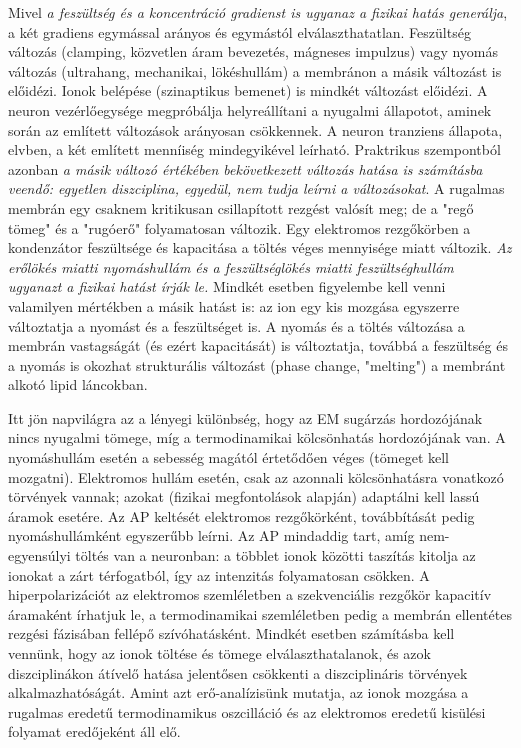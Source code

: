 \else
Mivel \textit{a feszültség és a koncentráció gradienst is ugyanaz a
fizikai hatás generálja}, a két gradiens egymással arányos és
egymástól elválaszthatatlan.
Feszültség változás (clamping, közvetlen áram bevezetés, mágneses impulzus) vagy nyomás változás (ultrahang, mechanikai, lökéshullám)
a membránon a másik változást is előidézi.
Ionok belépése (szinaptikus bemenet) is mindkét változást előidézi.
A neuron vezérlőegysége megpróbálja helyreállítani a nyugalmi állapotot,
aminek során az említett változások arányosan csökkennek.
A neuron tranziens állapota, elvben, a két említett menníiség mindegyikével leírható. Praktrikus szempontból azonban 
\textit{a másik változó értékében bekövetkezett változás hatása is számításba
veendő: egyetlen diszciplina, egyedül, nem tudja leírni a változásokat}.
A rugalmas membrán egy csaknem kritikusan csillapított rezgést valósít meg; de a "regő tömeg" és a "rugóerő" folyamatosan változik.
Egy elektromos rezgőkörben a kondenzátor feszültsége és kapacitása a
töltés véges mennyisége miatt változik.
\textit{Az erőlökés miatti nyomáshullám és a feszültséglökés miatti
feszültséghullám ugyanazt a fizikai hatást írják le.}
Mindkét esetben figyelembe kell venni valamilyen mértékben a másik 
hatást is: az ion egy kis mozgása egyszerre változtatja 
a nyomást és a feszültséget is.
A nyomás és a töltés változása a membrán vastagságát (és ezért kapacitását) is változtatja, továbbá a feszültség és a nyomás is 
okozhat strukturális változást (phase change, "melting")
a membránt alkotó lipid láncokban.


Itt jön napvilágra az a lényegi különbség, hogy az \gls{EM}
sugárzás hordozójának nincs nyugalmi tömege, míg a termodinamikai kölcsönhatás hordozójának van.
A nyomáshullám esetén a sebesség magától értetődően véges
(tömeget kell mozgatni).
Elektromos hullám esetén, csak az azonnali kölcsönhatásra vonatkozó
törvények vannak; azokat (fizikai megfontolások alapján) 
adaptálni kell lassú áramok esetére.
Az \gls{AP} keltését elektromos rezgőkörként, továbbítását pedig
nyomáshullámként egyszerűbb leírni.
Az \gls{AP} mindaddig tart, amíg nem-egyensúlyi töltés van a
neuronban: a többlet ionok közötti taszítás kitolja az ionokat a
zárt térfogatból, így az intenzitás folyamatosan csökken.
A hiperpolarizációt az elektromos szemléletben a szekvenciális rezgőkör
kapacitív áramaként írhatjuk le, a termodinamikai szemléletben pedig 
a membrán ellentétes rezgési fázisában fellépő szívóhatásként. 
Mindkét esetben számításba kell vennünk, hogy az ionok töltése és tömege 
elválaszthatalanok, és azok diszciplinákon átívelő hatása 
jelentősen csökkenti a diszciplináris törvények alkalmazhatóságát.
Amint azt erő-analízisünk mutatja, az ionok mozgása a rugalmas eredetű
termodinamikus oszcilláció és az elektromos eredetű kisülési folyamat
eredőjeként áll elő.
\fi

